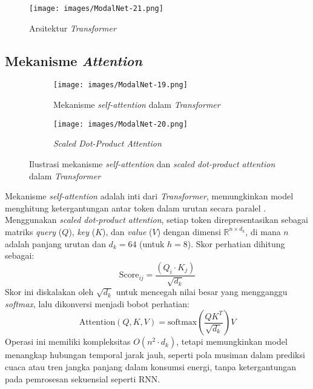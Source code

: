 \begin{figure}[H]
    \centering
    \texttt{[image: images/ModalNet-21.png]}
    \caption{Arsitektur \textit{Transformer} \autocite{Vaswani2017}}
    \label{fig:transformer_architecture}
\end{figure}

\subsection{Mekanisme \textit{Attention}}
\label{sec:attention}

\begin{figure}[H]
    \centering
    \begin{subfigure}[t]{0.3\textwidth}
        \centering
        \texttt{[image: images/ModalNet-19.png]}
        \caption{Mekanisme \textit{self-attention} dalam \textit{Transformer}}
        \label{fig:self_attention_a}
    \end{subfigure}
    \hfill
    \begin{subfigure}[t]{0.3\textwidth}
        \centering
        \texttt{[image: images/ModalNet-20.png]}
        \caption{\textit{Scaled Dot-Product Attention}}
        \label{fig:self_attention_b}
    \end{subfigure}
    \caption{Ilustrasi mekanisme \textit{self-attention} dan \textit{scaled dot-product attention} dalam \textit{Transformer} \autocite{Vaswani2017}}
    \label{fig:self_attention_comparison}
\end{figure}

Mekanisme \textit{self-attention} adalah inti dari \textit{Transformer}, memungkinkan model menghitung ketergantungan antar token dalam urutan secara paralel \citep{Vaswani2017}. Menggunakan \textit{scaled dot-product attention}, setiap token direpresentasikan sebagai matriks \textit{query} (\( Q \)), \textit{key} (\( K \)), dan \textit{value} (\( V \)) dengan dimensi \( \mathbb{R}^{n \times d_k} \), di mana \( n \) adalah panjang urutan dan \( d_k = 64 \) (untuk \( h=8 \)). Skor perhatian dihitung sebagai:
\begin{equation}
\text{Score}_{ij} = \frac{(Q_i \cdot K_j)}{\sqrt{d_k}}
\end{equation}
Skor ini diskalakan oleh \( \sqrt{d_k} \) untuk mencegah nilai besar yang mengganggu \textit{softmax}, lalu dikonversi menjadi bobot perhatian:
\begin{equation}
\text{Attention}(Q, K, V) = \text{softmax}\left(\frac{QK^T}{\sqrt{d_k}}\right)V
\end{equation}
Operasi ini memiliki kompleksitas \( O(n^2 \cdot d_k) \), tetapi memungkinkan model menangkap hubungan temporal jarak jauh, seperti pola musiman dalam prediksi cuaca atau tren jangka panjang dalam konsumsi energi, tanpa ketergantungan pada pemrosesan sekuensial seperti RNN.

